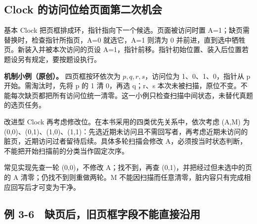 \subsection{Clock 的访问位给页面第二次机会}\label{OS03-auto-3}

基本 Clock 把页框排成环，指针指向下一个候选。页面被访问时置 A=1；缺页需替换时，检查指针所指页，A=0 就选它，A=1 则清为 0 并前进，直到选中牺牲页。新装入并被本次访问的页设 A=1，指针前移。指针初始位置、装入后位置若题设另有规定，要按题设执行。

\textbf{机制小例（原创）。} 四页框按环依次为 \(p,q,r,s\)，访问位为 1、0、1、0，指针从 p 开始。需淘汰时，先将 p 的 1 清 0，再选 q；r、s 本次未被扫描，原位不变。不能每次缺页都把所有访问位统一清零。这一小例只检查扫描中间状态，未替代真题的选页任务。

改进型 Clock 再考虑修改位。在本书采用的四类优先关系中，依次考虑 (A,M) 为 (0,0)、(0,1)、(1,0)、(1,1)：先选近期未访问且不需回写者，再考虑近期未访问的脏页，近期访问过者留待后续。具体多轮扫描会修改 A，必须按当时状态判断，不能把开始扫描前的分类当作固定次序。

常见实现先查一轮 (0,0)，不修改 A；找不到，再查 (0,1)，并把经过但未选中的页的 A 清零；仍找不到则重做两轮。M 不能因扫描而任意清零，脏内容只有完成相应回写后才可变为干净。

\subsection{例 3-6　缺页后，旧页框字段不能直接沿用}\label{OS03-ex5-6}

